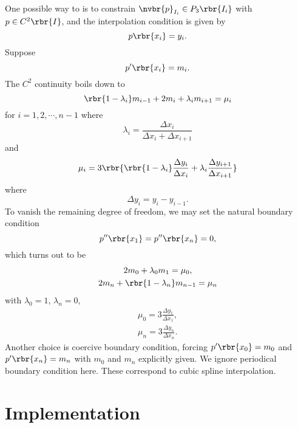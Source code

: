 \documentclass[english, nochinese]{pnote}
\begin{document}
One possible way to is to constrain $ \nvbr{p}_{I_i} \in P_3 \rbr{I_i} $ with $ p \in C^2 \rbr{I} $, and the interpolation condition is given by
\begin{equation}
p \rbr{x_i} = y_i.
\end{equation}
Suppose
\begin{equation}
p' \rbr{x_i} = m_i.
\end{equation}
The $C^2$ continuity boils down to
\begin{equation} \label{Eq:CubSplEq}
\rbr{ 1 - \lambda_i } m_{ i - 1 } + 2 m_i + \lambda_i m_{ i + 1 } = \mu_i
\end{equation}
for $ i = 1, 2, \cdots, n - 1 $ where
\begin{equation}
\lambda_i = \frac{ \Delta x_i }{ \Delta x_i + \Delta x_{ i + 1 } }
\end{equation}
and
\begin{equation}
\mu_i = 3 \rbr{ \rbr{ 1 - \lambda_i } \frac{ \Delta y_i }{ \Delta x_i } + \lambda_i \frac{ \Delta y_{ i + 1 } }{ \Delta x_{ i + 1 } } }
\end{equation}
where
\begin{equation}
\Delta y_i = y_i - y_{ i - 1 }.
\end{equation}
To vanish the remaining degree of freedom, we may set the natural boundary condition
\begin{equation}
p'' \rbr{x_1} = p'' \rbr{x_n} = 0,
\end{equation}
which turns out to be
\begin{gather}
\label{Eq:CubSplEq1}
2 m_0 + \lambda_0 m_1 = \mu_0, \\
\label{Eq:CubSplEqn}
2 m_n + \rbr{ 1 - \lambda_n } m_{ n - 1 } = \mu_n
\end{gather}
with $ \lambda_0 = 1 $, $ \lambda_n = 0 $,
\begin{gather}
\mu_0 = 3 \frac{ \Delta y_1 }{ \Delta x_1 }, \\
\mu_n = 3 \frac{ \Delta y_n }{ \Delta x_n }.
\end{gather}
Another choice is coercive boundary condition, forcing $ p' \rbr{x_0} = m_0 $ and $ p' \rbr{x_n} = m_n $ with $m_0$ and $m_n$ explicitly given. We ignore periodical boundary condition here. These correspond to cubic spline interpolation.

\section{Implementation}
\end{document}
